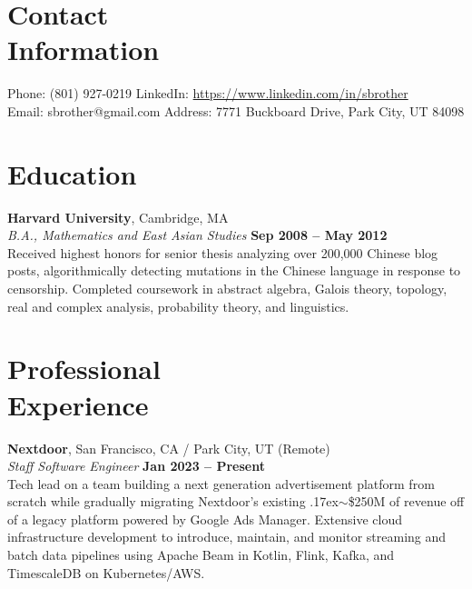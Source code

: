 \documentclass[margin,line]{resume}
\begin{document}
\begin{resume}
    \section{\mysidestyle Contact\\Information}

    Phone: (801) 927-0219       \hfill LinkedIn: \url{https://www.linkedin.com/in/sbrother} \\
    \noindent Email: sbrother@gmail.com  \hfill Address: 7771 Buckboard Drive, Park City, UT 84098 \vspace{0mm}\\\vspace{-4.5mm}

    \section{\mysidestyle Education}

    \textbf{Harvard University}, Cambridge, MA \vspace{2mm}\\\vspace{1mm}%
    \textsl{B.A., Mathematics and East Asian Studies} \hfill \textbf{Sep 2008 -- May 2012}\\
    Received highest honors for senior thesis analyzing over 200,000 Chinese
    blog posts, algorithmically detecting mutations in the Chinese language in
    response to censorship. Completed coursework in abstract algebra,
    Galois theory, topology, real and complex analysis, probability theory, and
    linguistics.

    \section{\mysidestyle Professional\\Experience}

    \textbf{Nextdoor}, San Francisco, CA / Park City, UT (Remote)  \vspace{2mm}\\\vspace{1mm}%
    \textsl{Staff Software Engineer} \hfill \textbf{Jan 2023 -- Present}\\
    Tech lead on a team building a next generation advertisement platform from
    scratch while gradually migrating Nextdoor's existing
    {\raise.17ex\hbox{$\scriptstyle\sim$}}\$250M of revenue off of a legacy
    platform powered by Google Ads Manager. Extensive cloud infrastructure
    development to introduce, maintain, and monitor streaming and batch data
    pipelines using Apache Beam in Kotlin, Flink, Kafka, and TimescaleDB on
    Kubernetes/AWS.


\end{resume}
\end{document}
